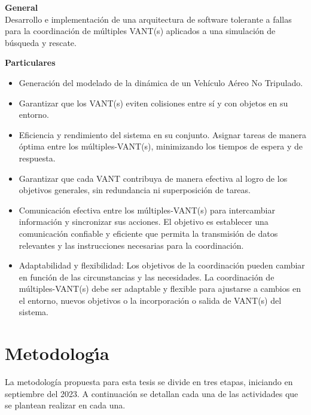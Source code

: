 \documentclass[11pt,epsf,times]{article}
\begin{document}
\textbf{General} \\

Desarrollo e implementación de una arquitectura de software tolerante a fallas para la coordinación de múltiples VANT(s) aplicados a una simulación de búsqueda y rescate.

\bigskip
\noindent
\textbf{Particulares} \\
\begin{itemize}
\item Generación del modelado de la dinámica de un Vehículo Aéreo No Tripulado.
\item Garantizar que los VANT(s) eviten colisiones entre sí y con objetos en su entorno.
\item Eficiencia y rendimiento del sistema en su conjunto. Asignar tareas de manera óptima entre los múltiples-VANT(s), minimizando los tiempos de espera y de respuesta.
\item Garantizar que cada VANT contribuya de manera efectiva al logro de los objetivos generales, sin redundancia ni superposición de tareas.
\item Comunicación efectiva entre los múltiples-VANT(s) para intercambiar información y sincronizar sus acciones. El objetivo es establecer una comunicación confiable y eficiente que permita la transmisión de datos relevantes y las instrucciones necesarias para la coordinación.
\item Adaptabilidad y flexibilidad: Los objetivos de la coordinación pueden cambiar en función de las circunstancias y las necesidades. La coordinación de múltiples-VANT(s) debe ser adaptable y flexible para ajustarse a cambios en el entorno, nuevos objetivos o la incorporación o salida de VANT(s) del sistema.
\end{itemize}

\newpage
\section{Metodolog\'{\i}a}

La metodología propuesta para esta tesis se divide en tres etapas, iniciando en septiembre del 2023. A continuación se detallan cada una de las actividades que se plantean realizar en cada una.
\end{document}
